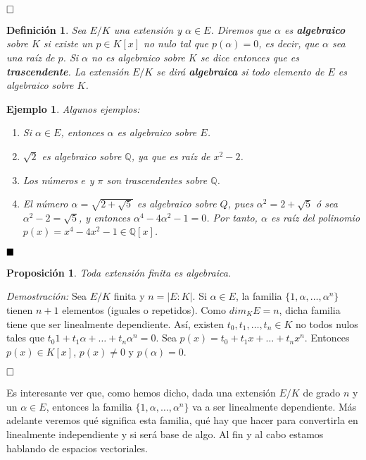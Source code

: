 \documentclass[12pt]{article}
\newtheorem{proposition}[theorem]{Proposición}
\newtheorem{definition}[theorem]{Definición}
\newtheorem{example}{Ejemplo}[theorem]
\begin{document}
$\hfill \square$

\begin{definition} Sea  $E/K$ una extensión y $\alpha \in E$. Diremos que $\alpha$ es \textbf{algebraico} sobre $K$ si existe un $p \in K[x]$ no nulo tal que $p(\alpha) = 0$, es decir, que $\alpha$ sea una raíz de $p$. Si $\alpha$ no es algebraico sobre $K$ se dice entonces que es \textbf{trascendente}. La extensión $E/K$ se dirá \textbf{algebraica} si todo elemento de $E$ es algebraico sobre $K$.
\end{definition}
\begin{example} Algunos ejemplos: \begin{enumerate}
\item Si $\alpha \in E$, entonces $\alpha$ es algebraico sobre $E$.
\item $\sqrt{2}$ es algebraico sobre $\mathbb{Q}$, ya que es raíz de $x^{2}-2$.
\item Los números $e$ y $\pi$ son trascendentes  sobre $\mathbb{Q}$.
\item El número $\alpha = \sqrt{2 + \sqrt{5}}$ es algebraico sobre $Q$, pues $\alpha^{2} = 2 + \sqrt{5}$ ó sea $\alpha^{2}-2 = \sqrt{5}$, y entonces $\alpha^{4}-4\alpha^{2}-1 = 0$. Por tanto, $\alpha$ es raíz del polinomio $p(x) = x^{4}-4x^{2}-1 \in \mathbb{Q}[x]$.
\end{enumerate}
\end{example}

$\hfill \blacksquare$
\begin{proposition} Toda extensión finita es algebraica.
\end{proposition}
\emph{Demostración: } Sea $E/K$ finita y $n = |E:K|$. Si $\alpha \in E$, la familia $\lbrace 1, \alpha, \ldots, \alpha^{n} \rbrace$ tienen $n+1$ elementos (iguales o repetidos). Como $dim_{K} E = n$, dicha familia tiene que ser linealmente dependiente. Así, existen $t_{0}, t_{1}, \ldots, t_{n} \in K$ no todos nulos tales que $t_{0}1 + t_{1}\alpha + \ldots + t_{n}\alpha^{n} = 0$. Sea $p(x) = t_{0} + t_{1}x + \ldots + t_{n}x^{n}$. Entonces $p(x) \in K[x]$, $p(x) \neq 0$ y $p(\alpha) = 0.$

$\hfill \square$

Es interesante ver que, como hemos dicho, dada una extensión $E/K$ de grado $n$ y un $\alpha \in E$, entonces la familia $\lbrace 1, \alpha, \ldots, \alpha^{n} \rbrace$ va a ser linealmente dependiente. Más adelante veremos qué significa esta familia, qué hay que hacer para convertirla en linealmente independiente y si será base de algo. Al fin y al cabo estamos hablando de espacios vectoriales.
\end{document}
